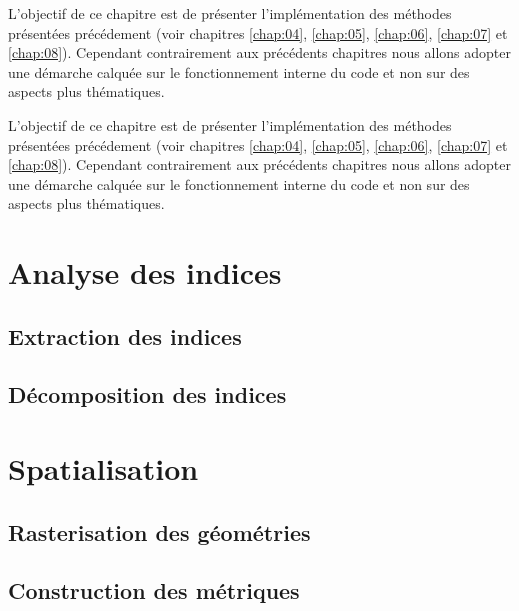%

\chaptertoc{}

L'objectif de ce chapitre est de présenter l'implémentation des
méthodes présentées précédement (voir chapitres \ref{chap:04},
\ref{chap:05}, \ref{chap:06}, \ref{chap:07} et
\ref{chap:08}). Cependant contrairement aux précédents chapitres nous
allons adopter une démarche calquée sur le fonctionnement interne du
code et non sur des aspects plus thématiques.


L'objectif de ce chapitre est de présenter l'implémentation des
méthodes présentées précédement (voir chapitres \ref{chap:04},
\ref{chap:05}, \ref{chap:06}, \ref{chap:07} et
\ref{chap:08}). Cependant contrairement aux précédents chapitres nous
allons adopter une démarche calquée sur le fonctionnement interne du
code et non sur des aspects plus thématiques.

\section{Analyse des indices}
\label{sec:9-1}

\subsection{Extraction des indices}
\label{subsec:9-1-1}

\subsection{Décomposition des indices}
\label{subsec:9-1-2}

\section{Spatialisation}
\label{sec:9-2}

\subsection{Rasterisation des géométries}
\label{subsec:9-2-1}

\subsection{Construction des métriques}
\label{subsec:9-2-2}

